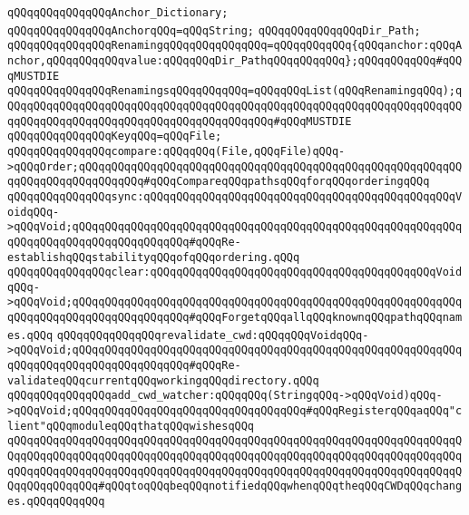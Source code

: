 \verb|qQQqqQQqqQQqqQQqAnchor_Dictionary;|\newline
\verb|qQQqqQQqqQQqqQQqAnchorqQQq=qQQqString;|\newline
\verb|qQQqqQQqqQQqqQQqDir_Path;|\newline
\newline
\verb|qQQqqQQqqQQqqQQqRenamingqQQqqQQqqQQqqQQq=qQQqqQQqqQQq{qQQqanchor:qQQqAnchor,qQQqqQQqqQQqvalue:qQQqqQQqDir_PathqQQqqQQqqQQq};qQQqqQQqqQQq#qQQqMUSTDIE|\newline
\verb|qQQqqQQqqQQqqQQqRenamingsqQQqqQQqqQQq=qQQqqQQqList(qQQqRenamingqQQq);qQQqqQQqqQQqqQQqqQQqqQQqqQQqqQQqqQQqqQQqqQQqqQQqqQQqqQQqqQQqqQQqqQQqqQQqqQQqqQQqqQQqqQQqqQQqqQQqqQQqqQQqqQQqqQQq#qQQqMUSTDIE|\newline
\newline
\verb|qQQqqQQqqQQqqQQqKeyqQQq=qQQqFile;|\newline
\newline
\newline
\verb|qQQqqQQqqQQqqQQqcompare:qQQqqQQq(File,qQQqFile)qQQq->qQQqOrder;qQQqqQQqqQQqqQQqqQQqqQQqqQQqqQQqqQQqqQQqqQQqqQQqqQQqqQQqqQQqqQQqqQQqqQQqqQQqqQQq#qQQqCompareqQQqpathsqQQqforqQQqorderingqQQq|\newline
\newline
\verb|qQQqqQQqqQQqqQQqsync:qQQqqQQqqQQqqQQqqQQqqQQqqQQqqQQqqQQqqQQqqQQqqQQqVoidqQQq->qQQqVoid;qQQqqQQqqQQqqQQqqQQqqQQqqQQqqQQqqQQqqQQqqQQqqQQqqQQqqQQqqQQqqQQqqQQqqQQqqQQqqQQqqQQqqQQq#qQQqRe-establishqQQqstabilityqQQqofqQQqordering.qQQq|\newline
\verb|qQQqqQQqqQQqqQQqclear:qQQqqQQqqQQqqQQqqQQqqQQqqQQqqQQqqQQqqQQqqQQqVoidqQQq->qQQqVoid;qQQqqQQqqQQqqQQqqQQqqQQqqQQqqQQqqQQqqQQqqQQqqQQqqQQqqQQqqQQqqQQqqQQqqQQqqQQqqQQqqQQqqQQq#qQQqForgetqQQqallqQQqknownqQQqpathqQQqnames.qQQq|\newline
\verb|qQQqqQQqqQQqqQQqrevalidate_cwd:qQQqqQQqVoidqQQq->qQQqVoid;qQQqqQQqqQQqqQQqqQQqqQQqqQQqqQQqqQQqqQQqqQQqqQQqqQQqqQQqqQQqqQQqqQQqqQQqqQQqqQQqqQQqqQQq#qQQqRe-validateqQQqcurrentqQQqworkingqQQqdirectory.qQQq|\newline
\newline
\verb|qQQqqQQqqQQqqQQqadd_cwd_watcher:qQQqqQQq(StringqQQq->qQQqVoid)qQQq->qQQqVoid;qQQqqQQqqQQqqQQqqQQqqQQqqQQqqQQqqQQq#qQQqRegisterqQQqaqQQq"client"qQQqmoduleqQQqthatqQQqwishesqQQq|\newline
\verb|qQQqqQQqqQQqqQQqqQQqqQQqqQQqqQQqqQQqqQQqqQQqqQQqqQQqqQQqqQQqqQQqqQQqqQQqqQQqqQQqqQQqqQQqqQQqqQQqqQQqqQQqqQQqqQQqqQQqqQQqqQQqqQQqqQQqqQQqqQQqqQQqqQQqqQQqqQQqqQQqqQQqqQQqqQQqqQQqqQQqqQQqqQQqqQQqqQQqqQQqqQQqqQQqqQQqqQQqqQQqqQQq#qQQqtoqQQqbeqQQqnotifiedqQQqwhenqQQqtheqQQqCWDqQQqchanges.qQQqqQQqqQQq|\newline
